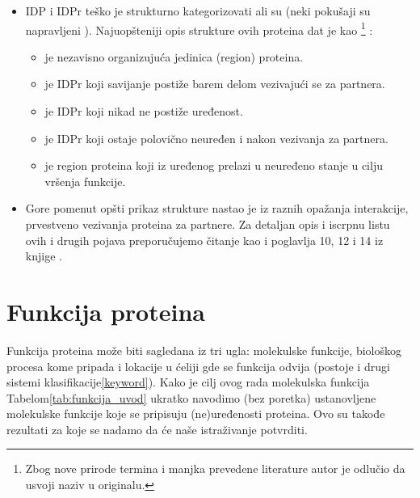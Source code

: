 \begin{itemize}
  \item 
    IDP i IDPr teško je strukturno kategorizovati \parencite{dunker2001,
      oldfield20014} ali su (neki pokušaji su napravljeni \parencite{dunker2001}).
      Najuopšteniji opis strukture ovih proteina dat je kao
      \footnote{ Zbog nove
        prirode termina i manjka prevedene literature autor je odlučio da
      usvoji naziv u originalu.} \parencite{uversky2016}:
    \begin{itemize}
      \item {}  je nezavisno organizujuća jedinica (region) proteina.
      \item {}  je IDPr koji savijanje postiže barem delom vezivajući se za partnera. 
      \item {}  je IDPr koji nikad ne postiže uređenost.
      \item {}  je IDPr koji ostaje polovično neuređen i nakon vezivanja za partnera.
      \item {}  je region proteina koji iz uređenog prelazi u neuređeno stanje u cilju vršenja funkcije.
    \end{itemize}

  \item 
    Gore pomenut opšti prikaz strukture nastao je iz raznih opažanja
    interakcije, prvestveno vezivanja proteina za partnere.
    Za detaljan opis i iscrpnu listu ovih i drugih pojava preporučujemo čitanje
    \parencite{a2z, uversky2016} kao i poglavlja 10, 12 i 14 iz knjige .

\end{itemize}

\section{Funkcija proteina}
Funkcija proteina može biti sagledana iz tri ugla: molekulske funkcije,
biološkog procesa kome pripada i lokacije u ćeliji gde se funkcija odvija
\parencite{go2000}(postoje i drugi sistemi klasifikacije\ref{keyword}).  Kako
je cilj ovog rada molekulska funkcija Tabelom\ref{tab:funkcija_uvod} ukratko
navodimo (bez poretka) ustanovljene \parencite{Xie2007} molekulske funkcije koje
se pripisuju (ne)uređenosti proteina. Ovo su takođe rezultati za koje se nadamo
da će naše istraživanje potvrditi.

